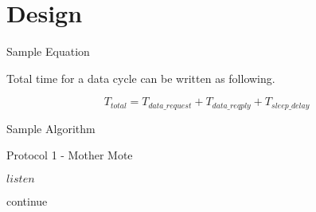 \chapter{Design}
\label{Design}

Sample Equation

Total time for a data cycle can be written as following.

\begin{equation}
T_{total} = T_{data\_request} + T_{data\_reqply} + T_{sleep\_delay}
\end{equation} 


Sample Algorithm
\begin{algorithm}[H]
\caption{Protocol 1 - Mother Mote}\label{algoProto1MM}
\begin{algorithmic}[1]
		\State {}
			\State $listen$
		\EndWhile
		
			\State continue
		\EndIf
		
		
		

	\EndFor
	\EndWhile
	
\EndProcedure

\end{algorithmic}
\end{algorithm}

